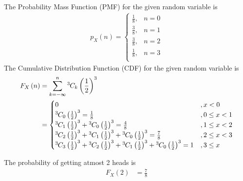 \documentclass{beamer}
\providecommand{\brak}[1]{\ensuremath{\left(#1\right)}}
\theoremstyle{remark}
\newcommand*{\permcomb}[4][0mu]{{{}^{#3}\mkern#1#2_{#4}}}
\newcommand*{\comb}[1][-1mu]{\permcomb[#1]{C}}
\numberwithin{equation}{section}
\begin{document}
\begin{frame}
The Probability Mass Function (PMF) for the given random variable is
\begin{align}
p_X(n) =
\begin{cases}
	\frac{1}{8}, & n = 0 \\
	\frac{3}{8}, & n = 1 \\
	\frac{3}{8}, & n = 2 \\
	\frac{1}{8}, & n = 3 \\
\end{cases}
\end{align}
The Cumulative Distribution Function (CDF) for the given random variable is
\begin{align}
  F_{X}\brak{n} &= \sum_{k = -\infty}^n\comb{3}{k}\brak{\frac{1}{2}}^3\\
  	&= \begin{cases}
    0 &, x < 0\\
    \comb{3}{0}\brak{\frac{1}{2}}^3 = \frac{1}{8} &, 0 \le x < 1\\
    \comb{3}{1}\brak{\frac{1}{2}}^3 + \comb{3}{0}\brak{\frac{1}{2}}^3 = \frac{4}{8}&, 1 \le x < 2\\
    \comb{3}{2}\brak{\frac{1}{2}}^3 + \comb{3}{1}\brak{\frac{1}{2}}^3 + \comb{3}{0}\brak{\frac{1}{2}}^3 = \frac{7}{8} &, 2 \le x < 3\\
    \comb{3}{3}\brak{\frac{1}{2}}^3 + \comb{3}{2}\brak{\frac{1}{2}}^3 + \comb{3}{1}\brak{\frac{1}{2}}^3 + \comb{3}{0}\brak{\frac{1}{2}}^3= 1 &, 3 \le x\\
  \end{cases}
\end{align}
\end{frame}
\begin{frame}
The probability of getting atmost 2 heads is
\begin{align}
  F_X\brak{2} &= \frac{7}{8}
\end{align}
\end{frame}
\end{document}
